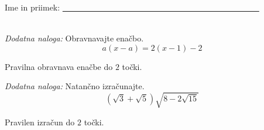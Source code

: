 \documentclass[addpoints]{exam}
\begin{document}
\begin{questions}
    






     \newpage

     \noindent Ime in priimek: \underline{~~~~~~~~~~~~~~~~~~~~~~~~~~~~~~~~~~~~~~~~~~~~~~~~}

     ~\\

    \bonusquestion[2]
    \textit{Dodatna naloga:} Obravnavajte enačbo. $$a(x-a)=2(x-1)-2$$

    \begin{solution}[10cm]
        Pravilna obravnava enačbe do $2$ točki.
    \end{solution}




        

    \bonusquestion[2]
    \textit{Dodatna naloga:} Natančno izračunajte. $$ \left(\sqrt{3}+\sqrt{5}\right)\sqrt{8-2\sqrt{15}} $$

    \begin{solution}[7cm]
        Pravilen izračun do $2$ točki.
    \end{solution}




\end{questions}
\end{document}
